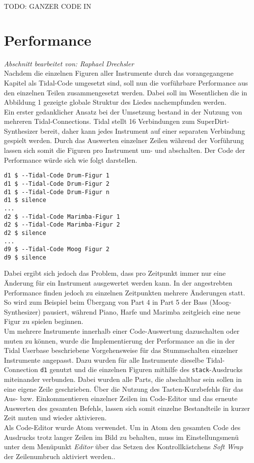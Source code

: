 \documentclass[
10pt, %
a4paper, %
oneside, %
headinclude,footinclude, %
BCOR5mm, %
]{scrartcl}
\begin{document}
TODO: GANZER CODE IN

\section{Performance}
\textit{Abschnitt bearbeitet von: Raphael Drechsler}\\

\noindent Nachdem die einzelnen Figuren aller Instrumente durch das vorangegangene Kapitel als Tidal-Code umgesetzt sind, soll nun die vorführbare Performance aus den einzelnen Teilen zusammengesetzt werden. Dabei soll im Wesentlichen die in Abbildung 1 gezeigte globale Struktur des Liedes nachempfunden werden.\\
Ein erster gedanklicher Ansatz bei der Umsetzung bestand in der Nutzung von mehreren Tidal-Connections. Tidal stellt 16 Verbindungen zum SuperDirt-Synthesizer bereit\cite{tid14}, daher kann jedes Instrument auf einer separaten Verbindung gespielt werden. Durch das Auswerten einzelner Zeilen während der Vorführung lassen sich somit die Figuren pro Instrument um- und abschalten. Der Code der Performance würde sich wie folgt darstellen.

\begin{lstlisting}
d1 $ --Tidal-Code Drum-Figur 1
d1 $ --Tidal-Code Drum-Figur 2
d1 $ --Tidal-Code Drum-Figur n
d1 $ silence
...
d2 $ --Tidal-Code Marimba-Figur 1
d2 $ --Tidal-Code Marimba-Figur 2
d2 $ silence
...
d9 $ --Tidal-Code Moog Figur 2
d9 $ silence
\end{lstlisting}

\noindent Dabei ergibt sich jedoch das Problem, dass pro Zeitpunkt immer nur eine Änderung für ein Instrument ausgewertet werden kann. In der angestrebten Performance finden jedoch zu einzelnen Zeitpunkten mehrere Änderungen statt. So wird zum Beispiel beim Übergang von Part 4 in Part 5 der Bass (Moog-Synthesizer) pausiert, während Piano, Harfe und Marimba zeitgleich eine neue Figur zu spielen beginnen.\\

\noindent Um mehrere Instrumente innerhalb einer Code-Auswertung dazuschalten oder muten zu können, wurde die Implementierung der Performance an die in der Tidal Userbase beschriebene Vorgehensweise für das Stummschalten einzelner Instrumente angepasst.\cite{tid13} Dazu wurden für alle Instrumente dieselbe Tidal-Connection \verb|d1| genutzt und die einzelnen Figuren mithilfe des \verb|stack|-Ausdrucks miteinander verbunden. Dabei wurden alle Parts, die abschaltbar sein sollen in eine eigene Zeile geschrieben. Über die Nutzung des Tasten-Kurzbefehls für das Aus- bzw. Einkommentieren einzelner Zeilen im Code-Editor und das erneute Auswerten des gesamten Befehls, lassen sich somit einzelne Bestandteile in kurzer Zeit muten und wieder aktivieren.\\
Als Code-Editor wurde Atom verwendet. Um in Atom den gesamten Code des Ausdrucks trotz langer Zeilen im Bild zu behalten, muss im Einstellungsmenü unter dem Menüpunkt \textit{Editor} über das Setzen des Kontrollkästchens \textit{Soft Wrap} der Zeilenumbruch aktiviert werden.\cite{atom1}. \\
\end{document}
